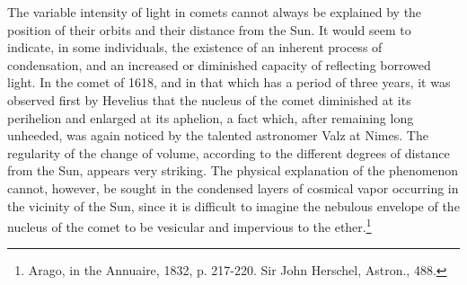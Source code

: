 The variable intensity of light in comets cannot always be explained by the position of their orbits and their distance from the Sun. It would seem to indicate, in some individuals, the existence of an inherent process of condensation, and an increased or diminished capacity of reflecting borrowed light. In the comet of 1618, and in that which has a period of three years, it was observed first by Hevelius that the nucleus of the comet diminished at its perihelion and enlarged at its aphelion, a fact which, after remaining long unheeded, was again noticed by the talented astronomer Valz at Nimes. The regularity of the change of volume, according to the different degrees of distance from the Sun, appears very striking. The physical explanation of the phenomenon cannot, however, be sought in the condensed layers of cosmical vapor occurring in the vicinity of the Sun, since it is difficult to imagine the nebulous envelope of the nucleus of the comet to be vesicular and impervious to the ether.\footnote{Arago, in the Annuaire, 1832, p. 217-220. Sir John Herschel, Astron., 488.}

